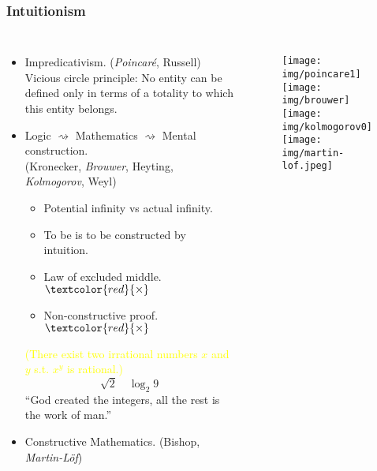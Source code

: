 \documentclass[UTF8,11pt,colorlinks,compress,openany]{beamer}%
\begin{document}
\begin{frame}\frametitle{Intuitionism}
\begin{columns}
\vspace*{-5ex}
	\begin{itemize}
		\item Impredicativism. (\emph{Poincar\'e}, Russell)\\
		Vicious circle principle: \small{No entity can be defined only in terms of a totality to which this entity belongs.}
		\item \textcolor{red}{} Logic $\rightsquigarrow$ Mathematics $\rightsquigarrow$ Mental construction.\\
		(Kronecker, \emph{Brouwer}, Heyting, \emph{Kolmogorov}, Weyl)\\
		\begin{itemize}
		\item Potential infinity vs actual infinity.
		\item To be is to be constructed by intuition.
		\item Law of excluded middle.$\textcolor{red}{\times}$
		\item Non-constructive proof.$\textcolor{red}{\times}$
		\end{itemize}
		\textcolor{yellow}{(There exist two irrational numbers $x$ and $y$ s.t. $x^y$ is rational.)}
		\[\sqrt{2}\quad \log_2 9\]
		``God created the integers, all the rest is the work of man.''\\
		\item Constructive Mathematics. (Bishop, \emph{Martin-L\"of})
	\end{itemize}
\vspace*{-2ex}
\begin{figure}
	\texttt{[image: img/poincare1]}\\
	\texttt{[image: img/brouwer]}\\
	\texttt{[image: img/kolmogorov0]}\\
	\texttt{[image: img/martin-lof.jpeg]}
\end{figure}
\end{columns}
\end{frame}
\end{document}
